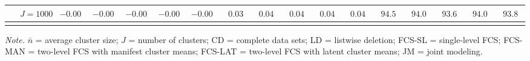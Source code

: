 \begin{sidewaystable}
\begin{threeparttable}
\begin{tabular}{llccccccccccccccc}
 & \nopagebreak $\;J=1000$  & ${-}0.00\phantom{0}$ & ${-}0.00\phantom{0}$ & ${-}0.00\phantom{0}$ & ${-}0.00\phantom{0}$ & ${-}0.00\phantom{0}$ & $\phantom{0}0.03\phantom{0}$ & $\phantom{0}0.04\phantom{0}$ & $\phantom{0}0.04\phantom{0}$ & $\phantom{0}0.04\phantom{0}$ & $\phantom{0}0.04\phantom{0}$ & $\phantom{0}94.5\phantom{0}$ & $\phantom{0}94.0\phantom{0}$ & $\phantom{0}93.6\phantom{0}$ & $\phantom{0}94.0\phantom{0}$ & $\phantom{0}93.8\phantom{0}$ \\
[0.5ex]\hline\\[-1.6ex] 
\end{tabular}
\begin{tablenotes}{\footnotesize \textit{Note.} $\bar{n}$ = average cluster size; $J$ = number of clusters; CD = complete data sets; LD = listwise deletion; FCS-SL = single-level FCS; FCS-MAN = two-level FCS with manifest cluster means; FCS-LAT = two-level FCS with latent cluster means; JM = joint modeling.}\end{tablenotes}
\end{threeparttable}
\end{sidewaystable}
